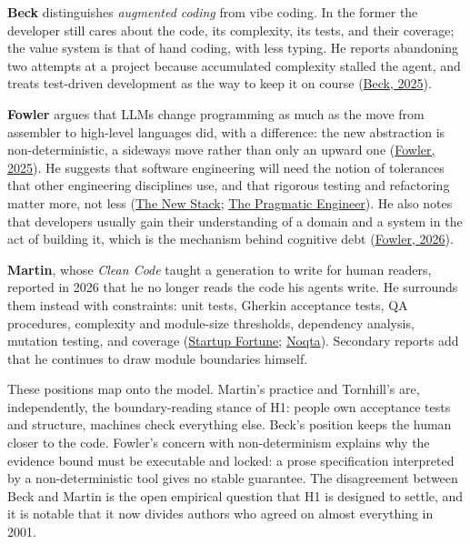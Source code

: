 \documentclass[11pt]{article}
\begin{document}
\textbf{Beck} distinguishes \emph{augmented coding} from vibe coding. In the former the developer still cares about the code, its complexity, its tests, and their coverage; the value system is that of hand coding, with less typing. He reports abandoning two attempts at a project because accumulated complexity stalled the agent, and treats test-driven development as the way to keep it on course (\href{https://newsletter.kentbeck.com/p/augmented-coding-beyond-the-vibes}{Beck, 2025}).

\textbf{Fowler} argues that LLMs change programming as much as the move from assembler to high-level languages did, with a difference: the new abstraction is non-deterministic, a sideways move rather than only an upward one (\href{https://martinfowler.com/articles/2025-nature-abstraction.html}{Fowler, 2025}). He suggests that software engineering will need the notion of tolerances that other engineering disciplines use, and that rigorous testing and refactoring matter more, not less (\href{https://thenewstack.io/martin-fowler-on-preparing-for-ais-nondeterministic-computing/}{The New Stack}; \href{https://newsletter.pragmaticengineer.com/p/martin-fowler}{The Pragmatic Engineer}). He also notes that developers usually gain their understanding of a domain and a system in the act of building it, which is the mechanism behind cognitive debt (\href{https://www.martinfowler.com/fragments/2026-02-09.html}{Fowler, 2026}).

\textbf{Martin}, whose \emph{Clean Code} taught a generation to write for human readers, reported in 2026 that he no longer reads the code his agents write. He surrounds them instead with constraints: unit tests, Gherkin acceptance tests, QA procedures, complexity and module-size thresholds, dependency analysis, mutation testing, and coverage (\href{https://startupfortune.com/?p=16790}{Startup Fortune}; \href{https://noqta.tn/en/blog/disciplined-agentic-engineering-uncle-bob-tdd-ai-2026}{Noqta}). Secondary reports add that he continues to draw module boundaries himself.

These positions map onto the model. Martin's practice and Tornhill's are, independently, the boundary-reading stance of H1: people own acceptance tests and structure, machines check everything else. Beck's position keeps the human closer to the code. Fowler's concern with non-determinism explains why the evidence bound must be executable and locked: a prose specification interpreted by a non-deterministic tool gives no stable guarantee. The disagreement between Beck and Martin is the open empirical question that H1 is designed to settle, and it is notable that it now divides authors who agreed on almost everything in 2001.
\end{document}
